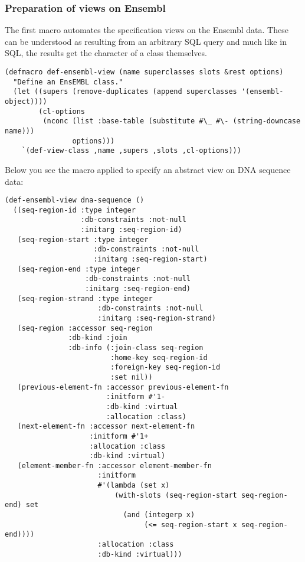 \documentclass{book}
\begin{document}
\subsubsection{Preparation of views on Ensembl}

The first macro automates the specification views on the Ensembl data. These
can be understood as resulting from an arbitrary SQL query and much like in 
SQL, the results get the character of a class themselves.

\begin{lstlisting}
(defmacro def-ensembl-view (name superclasses slots &rest options)
  "Define an EnsEMBL class."
  (let ((supers (remove-duplicates (append superclasses '(ensembl-object))))
        (cl-options
         (nconc (list :base-table (substitute #\_ #\- (string-downcase name)))
                options)))
    `(def-view-class ,name ,supers ,slots ,cl-options)))
\end{lstlisting}

Below you see the macro applied to specify an abstract view on DNA sequence data:
\begin{lstlisting}
(def-ensembl-view dna-sequence ()
  ((seq-region-id :type integer
                  :db-constraints :not-null
                  :initarg :seq-region-id)
   (seq-region-start :type integer
                     :db-constraints :not-null
                     :initarg :seq-region-start)
   (seq-region-end :type integer
                   :db-constraints :not-null
                   :initarg :seq-region-end)
   (seq-region-strand :type integer
                      :db-constraints :not-null
                      :initarg :seq-region-strand)
   (seq-region :accessor seq-region
               :db-kind :join
               :db-info (:join-class seq-region
                         :home-key seq-region-id
                         :foreign-key seq-region-id
                         :set nil))
   (previous-element-fn :accessor previous-element-fn
                        :initform #'1-
                        :db-kind :virtual
                        :allocation :class)
   (next-element-fn :accessor next-element-fn
                    :initform #'1+
                    :allocation :class
                    :db-kind :virtual)
   (element-member-fn :accessor element-member-fn
                      :initform
                      #'(lambda (set x)
                          (with-slots (seq-region-start seq-region-end) set
                            (and (integerp x)
                                 (<= seq-region-start x seq-region-end))))
                      :allocation :class
                      :db-kind :virtual)))
\end{lstlisting}
\end{document}
